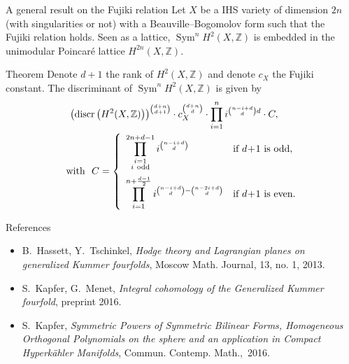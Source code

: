 \documentclass[final]{beamer}
\newlength{\sepwid}
\newlength{\onecolwid}
\DeclareMathOperator{\Sym}{Sym}
\DeclareMathOperator{\discr}{discr}
\newcommand{\Z}{\mathbb{Z}}
\begin{document}
\begin{frame}[t]
\begin{columns}[t]
\begin{column}{\sepwid}\end{column} %

\begin{column}{\onecolwid} %


\begin{block}{A general result on the Fujiki relation}
Let $X$ be a IHS variety of dimension $2n$ (with singularities or not) with a Beauville--Bogomolov form such that the Fujiki relation holds.
Seen as a lattice, $\Sym^n\!H^2(X,\Z)$ is embedded in the unimodular Poincar\'e lattice $H^{2n}(X,\Z)$. 

\begin{alertblock}{Theorem}
Denote $d+1$ the rank of $H^2(X,\Z)$ and denote $c_X$ the Fujiki constant.
The discriminant of $\Sym^n\!H^2(X,\Z)$ is given by
\begin{gather*}
\left(\discr \left(H^2(X,\Z)\right)\right)^{\binom{d+n}{d+1}}\cdot c_X^{\binom{d+n}{d}} \cdot \prod_{i=1}^n i^{\binom{n-i+d}{d}d} 
\cdot C, \\
\qquad \text{with } \ 
C=
\left\{
 \begin{array}{*2{l}p{5cm}}
 \displaystyle\prod_{\substack{i=1 \\ i\ \text{odd}\\\ }}^{2n+d-1}i^{\binom{n-i+d}{d}} &\text{if }d\!+\! 1\text{ is odd}, \\
 \displaystyle\prod_{i=1}^{n+\frac{d-1}{2}} i^{\binom{n-i+d}{d} - \binom{n-2i+d}{d}} &\text{if }d\! +\! 1\text{ is even}.
\end{array}
\right.
\end{gather*}
\end{alertblock}
\end{block}



\begin{block}{References}

\begin{itemize}
\small
\item B.~Hassett, Y.~Tschinkel, \emph{ Hodge theory and Lagrangian planes on 
  generalized Kummer fourfolds}, Moscow Math. Journal, 13, no. 1, 2013.
\item S.~Kapfer, G.~Menet, \emph{Integral cohomology of the Generalized Kummer fourfold}, preprint 2016.
\item S.~Kapfer, \emph{Symmetric Powers of Symmetric Bilinear Forms, Homogeneous Orthogonal Polynomials on the sphere and an application in Compact Hyperk\"ahler Manifolds}, Commun. Contemp. Math.,~2016.
\end{itemize}
\end{block}


\end{column}
\end{columns}
\end{frame}
\end{document}
